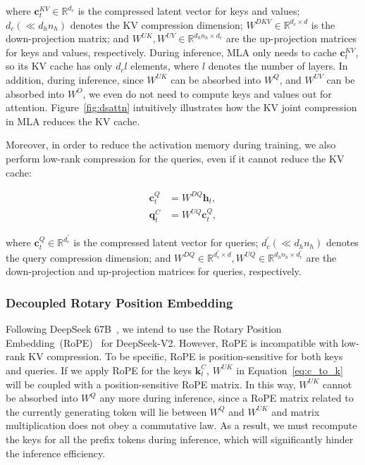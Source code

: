 where $\mathbf{c}_{t}^{KV} \in \mathbb{R}^{d_c}$ is the compressed latent vector for keys and values; $d_c (\ll d_h n_h)$ denotes the KV compression dimension; $W^{DKV} \in \mathbb{R}^{d_c \times d}$ is the down-projection matrix; and $W^{UK},W^{UV} \in \mathbb{R}^{d_h n_h \times d_c}$ are the up-projection matrices for keys and values, respectively. During inference, MLA only needs to cache $\mathbf{c}_{t}^{KV}$, so its KV cache has only $d_{c}l$ elements, where $l$ denotes the number of layers. In addition, during inference, since $W^{UK}$ can be absorbed into $W^{Q}$, and $W^{UV}$ can be absorbed into $W^{O}$, we even do not need to compute keys and values out for attention. 
Figure~\ref{fig:dsattn} intuitively illustrates how the KV joint compression in MLA reduces the KV cache. 

Moreover, in order to reduce the activation memory during training, we also perform low-rank compression for the queries, even if it cannot reduce the KV cache:

\begin{align}
    \mathbf{c}_{t}^{Q} &= W^{DQ} \mathbf{h}_{t}, \\
    \mathbf{q}_{t}^{C} &= W^{UQ} \mathbf{c}_{t}^{Q},
\end{align}

where $\mathbf{c}_{t}^{Q} \in \mathbb{R}^{d_c^{\prime}}$ is the compressed latent vector for queries; 
$d_c^{\prime} (\ll d_h n_h)$ denotes the query compression dimension; and $W^{DQ} \in \mathbb{R}^{d_c^{\prime} \times d}, W^{UQ} \in \mathbb{R}^{d_h n_h \times d_c^{\prime}}$ are the down-projection and up-projection matrices for queries, respectively. 

\subsubsection{Decoupled Rotary Position Embedding}

Following DeepSeek 67B~\citep{deepseek1}, we intend to use the Rotary Position Embedding~(RoPE)~\citep{su2024roformer} for DeepSeek-V2. However, RoPE is incompatible with low-rank KV compression. To be specific, RoPE is position-sensitive for both keys and queries. If we apply RoPE for the keys $\mathbf{k}_{t}^{C}$, $W^{UK}$ in Equation~\ref{eq:c_to_k} will be coupled with a position-sensitive RoPE matrix. In this way, $W^{UK}$ cannot be absorbed into $W^{Q}$ any more during inference, since a RoPE matrix related to the currently generating token will lie between $W^{Q}$ and $W^{UK}$ and matrix multiplication does not obey a commutative law. As a result, we must recompute the keys for all the prefix tokens during inference, which will significantly hinder the inference efficiency. 

